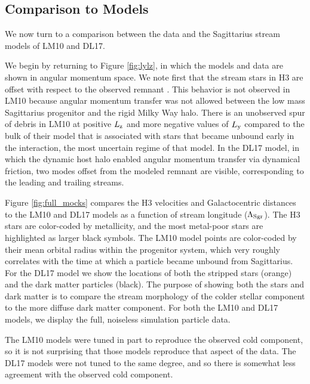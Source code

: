 \documentclass[twocolumn,tighten,twocolappendix]{aastex63}
\newcommand{\sgr}{Sagittarius}
\newcommand{\Ly}{L_{\rm y}}
\newcommand{\Lz}{L_{\rm z}}
\begin{document}
\begin{CJK*}{UTF8}{gbsn}
\section{Comparison to Models}
\label{s:comp2models}

We now turn to a comparison between the data and the \sgr{} stream models of LM10 and DL17.

We begin by returning to Figure \ref{fig:lylz}, in which the models and data are shown in angular momentum space.  We note first that the stream stars in H3 are offset with respect to the observed remnant \citep{Fritz18}.  This behavior is not observed in LM10 because angular momentum transfer was not allowed between the low mass \sgr{} progenitor and the rigid Milky Way halo. There is an unobserved spur of debris in LM10 at positive $\Lz$ and more negative values of $\Ly$ compared to the bulk of their model that is associated with stars that became unbound early in the interaction, the most uncertain regime of that model. In the DL17 model, in which the dynamic host halo enabled angular momentum transfer via dynamical friction, two modes offset from the modeled remnant are visible, corresponding to the leading and trailing streams.

Figure \ref{fig:full_mocks} compares the H3 velocities and Galactocentric distances to the LM10 and DL17 models as a function of stream longitude ($\Lambda_{\rm Sgr}$).  The H3 stars are color-coded by metallicity, and the most metal-poor stars are highlighted as larger black symbols.  The LM10 model points are color-coded by their mean orbital radius within the progenitor system, which very roughly correlates with the time at which a particle became unbound from \sgr{}.  For the DL17 model we show the locations of both the stripped stars (orange) and the dark matter particles (black).  The purpose of showing both the stars and dark matter is to compare the stream morphology of the colder stellar component to the more diffuse dark matter component.  For both the LM10 and DL17 models, we display the full, noiseless simulation particle data.

The LM10 models were tuned in part to reproduce the observed cold component, so it is not surprising that those models reproduce that aspect of the data.  The DL17 models were not tuned to the same degree, and so there is somewhat less agreement with the observed cold component.


\end{CJK*}
\end{document}
